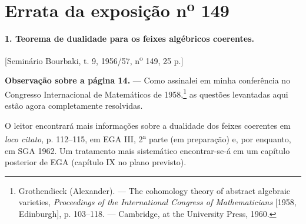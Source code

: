 \clearpage
\chapter*{Errata da exposição n\textsuperscript{o} 149}
\setcounter{footnote}{0}

\noindent\textbf{1. Teorema de dualidade para os feixes algébricos
coerentes.}

\begin{center}
[Seminário Bourbaki, t. 9, 1956/57, n\textsuperscript{o} 149, 25 p.]
\end{center}

\noindent\textbf{Observação sobre a página 14.} --- Como assinalei em minha
conferência no Congresso Internacional de Matemáticos de 1958,\footnote{
Grothendieck (Alexander). --- The cohomology theory of abstract algebraic
varieties, \emph{Proceedings of the International Congress of Mathematicians}
[1958, Edinburgh], p. 103--118. --- Cambridge, at the University Press, 1960.}
as questões levantadas aqui estão agora completamente resolvidas.

O leitor encontrará mais informações sobre a dualidade dos feixes
coerentes em \emph{loco citato}\footnotemark[1], p. 112--115, em EGA III,
2\textsuperscript{a} parte (em preparação) e, por enquanto, em SGA 1962.
Um tratamento mais sistemático encontrar-se-á em um capítulo posterior de EGA
(capítulo IX no plano previsto).
\par
